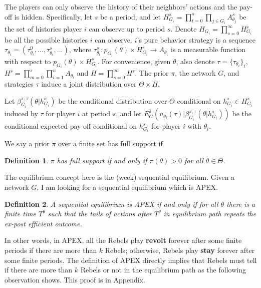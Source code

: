 \documentclass[12pt,letter]{article}
\newtheorem{definition}{Definition}[section]
\theoremstyle{definition}
\theoremstyle{remark}
\theoremstyle{claim}
\begin{document}
The players can only observe the history of their neighbors' actions and the pay-off is hidden. Specifically, let $s$ be a period, and let $H^s_{G_i}=\prod^s_{t=0}\prod_{j\in G_i}A^s_{\theta_j}$ be the set of histories player $i$ can observe up to period $s$. Denote $H_{G_i}=\prod^{\infty}_{s=0}H^s_{G_i}$ be all the possible histories $i$ can observe. $i$'s pure behavior strategy is a sequence $\tau_{\theta_i}=(\tau^0_{\theta_i},...,\tau^s_{\theta_i},...)$, where $\tau^s_{\theta_i}: p_{G_i}(\theta)\times H^s_{G_i}\rightarrow A_{\theta_i}$ is a  measurable function with respect to $p_{G_i}(\theta)\times H^s_{G_i}$. For convenience, given $\theta$, also denote $\tau=\{\tau_{\theta_i}\}_i$,  $H^s=\prod^s_{m=0}\prod^n_{i=1}A_{\theta_i}$ and $H=\prod^{\infty}_{s=0}H^s$. The prior $\pi$, the network $G$, and strategies $\tau$ induce a joint distribution over $\Theta\times H$. 

Let 
$\beta^{\pi,\tau}_{G_i}(\theta|h^{s}_{G_i})$
be the conditional distribution over $\Theta$ conditional on $h^{s}_{G_i}\in H^s_{G_i}$ induced by $\tau$ for player $i$ at period $s$, and let
$E^{\delta}_G(u_{\theta_i}(\tau)|\beta^{\pi,\tau}_{G_i}(\theta|h^{s}_{G_i}))$
be the conditional expected pay-off conditional on $h^{s}_{G_i}$ for player $i$ with ${\theta_i}$.

We say a prior $\pi$ over a finite set has full support if  
\begin{definition}
$\pi$ has full support if and only if $\pi(\theta)>0$ for all $\theta\in \Theta$.
\end{definition}

The equilibrium concept here is the (week) sequential equilibrium. Given a network $G$, I am looking for a sequential equilibrium which is APEX. 

\begin{definition}\label{Def_expost_efficient}
A sequential equilibrium is APEX if and only if for all $\theta$ there is a finite time $T^{\theta}$ such that the tails of actions after $T^{\theta}$ in equilibrium path repeats the ex-post efficient outcome.
\end{definition}

In other words, in APEX, all the Rebels play \textbf{revolt} forever after some finite periods if there are more than $k$ Rebels; otherwise, Rebels play \textbf{stay} forever after some finite periods. The definition of APEX directly implies that Rebels must tell if there are more than $k$ Rebels or not in the equilibrium path as the following observation shows. This proof is in Appendix.
\end{document}
